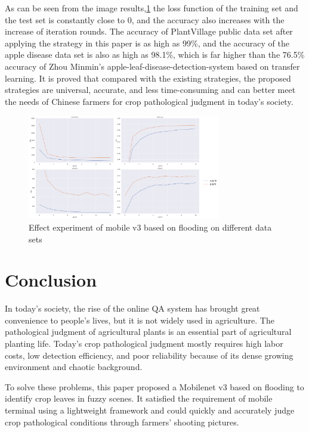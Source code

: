 \documentclass[a4paper,fleqn]{cas-sc}
\begin{document}
As can be seen from the image results,\ref{fig:f9} the loss function of the training set and the test set is constantly close to 0, and the accuracy also increases with the increase of iteration rounds. The accuracy of PlantVillage public data set after applying the strategy in this paper is as high as 99\%, and the accuracy of the apple disease data set is also as high as 98.1\%, which is far higher than the 76.5\% accuracy of Zhou Minmin's apple-leaf-disease-detection-system based on transfer learning.\cite{ZhouMing} It is proved that compared with the existing strategies, the proposed strategies are universal, accurate, and less time-consuming and can better meet the needs of Chinese farmers for crop pathological judgment in today's society.
\begin{figure}
\centering
\includegraphics[width=0.75\textwidth]{figs_rev1/f9.png}
\caption{Effect experiment of mobile v3 based on flooding on different data sets}
\label{fig:f9}
\end{figure}

\section{Conclusion}
In today's society, the rise of the online QA system has brought great convenience to people's lives, but it is not widely used in agriculture. The pathological judgment of agricultural plants is an essential part of agricultural planting life. Today's crop pathological judgment mostly requires high labor costs, low detection efficiency, and poor reliability because of its dense growing environment and chaotic background. 

To solve these problems, this paper proposed a Mobilenet v3 based on flooding to identify crop leaves in fuzzy scenes. It satisfied the requirement of mobile terminal using a lightweight framework and could quickly and accurately judge crop pathological conditions through farmers' shooting pictures. 
\end{document}
